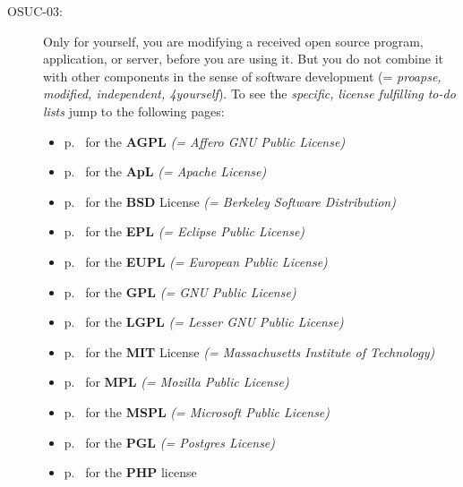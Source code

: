 \begin{description}
\item[OSUC-03:]\label{OSUC-03-DEF} Only for yourself, you are modifying a
received open source program, application, or server, before you are using it.
But you do not combine it with other components in the sense of software
development (= \textit{proapse, modified, independent, 4yourself}).
To see the \textit{specific, license fulfilling to-do lists} jump to the
following pages:
   \begin{itemize}
    \item p.\ \pageref{OSUC-03-AGPL} for the \textbf{AGPL}
      \textit{(= Affero GNU Public License)} 
    \item p.\ \pageref{OSUC-03-Apache20} for the \textbf{ApL}
      \textit{(= Apache License)}
    \item p.\ \pageref{OSUC-03-BSD} for the \textbf{BSD} License
      \textit{(= Berkeley Software Distribution)}
    \item p.\ \pageref{OSUC-03-EPL} for the \textbf{EPL}
      \textit{(= Eclipse Public License)}     
    \item p.\ \pageref{OSUC-03-EUPL} for the \textbf{EUPL}
      \textit{(= European Public License)} 
    \item p.\ \pageref{OSUC-03-GPL} for the \textbf{GPL}
       \textit{(= GNU Public License)} 
    \item p.\ \pageref{OSUC-03-LGPL} for the \textbf{LGPL}
      \textit{(= Lesser GNU Public License)}           
    \item p.\ \pageref{OSUC-03-MIT} for the \textbf{MIT} License
       \textit{(= Massachusetts Institute of Technology)} 
    \item p.\ \pageref{OSUC-03-MPL} for \textbf{MPL}
      \textit{(= Mozilla Public License)}     
    \item p.\ \pageref{OSUC-03-MsPL} for the \textbf{MSPL}
      \textit{(= Microsoft Public License)} 
    \item p.\ \pageref{OSUC-03-PGL} for the \textbf{PGL}
      \textit{(= Postgres License)} 
    \item p.\ \pageref{OSUC-03-PHP} for the \textbf{PHP} license 
  \end{itemize}


\end{description}
